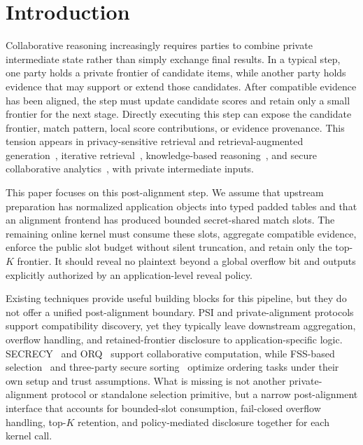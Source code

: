 \documentclass[conference,compsoc,letterpaper]{IEEEtran}
\theoremstyle{definition}
\theoremstyle{remark}
\begin{document}
\section{Introduction}
\label{sec:intro}
Collaborative reasoning increasingly requires parties to combine private intermediate state rather than simply exchange final results.
In a typical step, one party holds a private frontier of candidate items, while another party holds evidence that may support or extend those candidates.
After compatible evidence has been aligned, the step must update candidate scores and retain only a small frontier for the next stage.
Directly executing this step can expose the candidate frontier, match pattern, local score contributions, or evidence provenance.
This tension appears in privacy-sensitive retrieval and retrieval-augmented generation~\cite{zeng2024exploring,koga2024privacy,tan2026privgemo}, iterative retrieval~\cite{zai2026proh,sun2019pullnet,sun2024thinkongraph}, knowledge-based reasoning~\cite{tan2025paths,ren2020query2box,tan2025hydrarag,tan2026weaving,tan2026memotime}, and secure collaborative analytics~\cite{liagouris2023secrecy,poddar2021senate,ref3}, with private intermediate inputs.

This paper focuses on this post-alignment step.
We assume that upstream preparation has normalized application objects into typed padded tables and that an alignment frontend has produced bounded secret-shared match slots.
The remaining online kernel must consume these slots, aggregate compatible evidence, enforce the public slot budget without silent truncation, and retain only the top-$K$ frontier.
It should reveal no plaintext beyond a global overflow bit and outputs explicitly authorized by an application-level reveal policy.

Existing techniques provide useful building blocks for this pipeline, but they do not offer a unified post-alignment boundary.
PSI and private-alignment protocols support compatibility discovery, yet they typically leave downstream aggregation, overflow handling, and retained-frontier disclosure to application-specific logic.
SECRECY~\cite{liagouris2023secrecy} and ORQ~\cite{ref3} support collaborative computation, while FSS-based selection~\cite{agarwal2024secure} and three-party secure sorting~\cite{asharov2022efficient} optimize ordering tasks under their own setup and trust assumptions.
What is missing is not another private-alignment protocol or standalone selection primitive, but a narrow post-alignment interface that accounts for bounded-slot consumption, fail-closed overflow handling, top-$K$ retention, and policy-mediated disclosure together for each kernel call.
\end{document}
